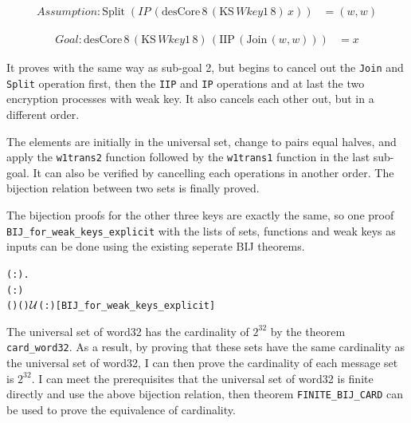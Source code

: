 \documentclass{article}
\begin{document}
\begin{equation*}
\begin{split}
 Assumption: \text{Split} \; (IP \,(\text{desCore} \,8 \,(\text{KS} \,Wkey1 \,8) \,x)) &= (w, w)
\end{split}
\end{equation*}

\begin{equation*}
\begin{split}
 Goal: \text{desCore} \,8 \,(\text{KS} \,Wkey1 \,8) \,(\text{IIP} \,(\text{Join} \,(w, w))) &= x
\end{split}
\end{equation*}

It proves with the same way as sub-goal 2, but begins to cancel out the \verb|Join| and \verb|Split| operation first, then
the \verb|IIP| and \verb|IP| operations and at last the two encryption processes with weak key. It also cancels each other out,
but in a different order.

The elements are initially in the universal set, change to pairs equal halves, and apply the \verb|w1trans2| function followed
by the \verb|w1trans1| function in the last sub-goal. It can also be verified by cancelling each operations in another order.
The bijection relation between two sets is finally proved.

The bijection proofs for the other three keys are exactly the same, so one proof \verb|BIJ_for_weak_keys_explicit| with the lists of sets, functions and
weak keys as inputs can be done using the existing seperate BIJ theorems.

\begin{alltt}
\HOLTokenTurnstile{} \HOLSymConst{\HOLTokenForall{}}( :).
      \HOLSymConst{\HOLTokenLt{}} ( :) \HOLSymConst{\HOLTokenImp{}}
      (  ) (  ) \ensuremath{{\cal{U}}}(:)\hfill{[BIJ_for_weak_keys_explicit]}
\end{alltt}

The universal set of word32 has the cardinality of $2^{32}$ by the theorem \\
\verb|card_word32|. As a result, by proving that
these sets have the same cardinality as the universal set of word32, I can then prove the cardinality of each message set
is $2^{32}$. I can meet the prerequisites that the universal set of word32 is finite directly and use the above
bijection relation, then theorem \verb|FINITE_BIJ_CARD| can be used to prove the equivalence of cardinality.
\end{document}
